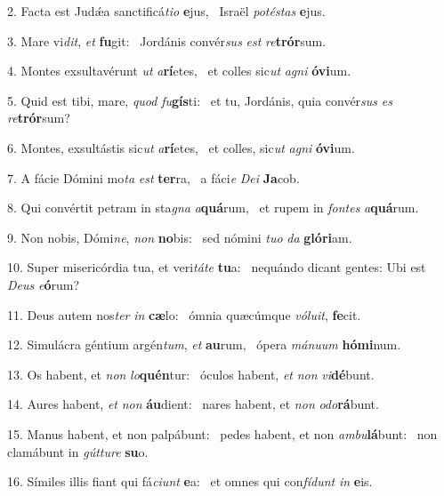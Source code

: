 2. Facta est Judǽa sanctificá\textit{ti}\textit{o} \textbf{e}jus, \ast\  Israël \textit{pot}\textit{és}\textit{tas} \textbf{e}jus.\

3. Mare vi\textit{dit}, \textit{et} \textbf{fu}git: \ast\  Jordánis convér\textit{sus} \textit{est} \textit{re}\textbf{trór}sum.\

4. Montes exsultavérunt \textit{ut} \textit{a}\textbf{rí}etes, \ast\  et colles sic\textit{ut} \textit{a}\textit{gni} \textbf{ó}\textbf{vi}um.\

5. Quid est tibi, mare, \textit{quod} \textit{fu}\textbf{gís}ti: \ast\  et tu, Jordánis, quia convér\textit{sus} \textit{es} \textit{re}\textbf{trór}sum?\

6. Montes, exsultástis sic\textit{ut} \textit{a}\textbf{rí}etes, \ast\  et colles, sic\textit{ut} \textit{a}\textit{gni} \textbf{ó}\textbf{vi}um.\

7. A fácie Dómini mo\textit{ta} \textit{est} \textbf{ter}ra, \ast\  a fáci\textit{e} \textit{De}\textit{i} \textbf{Ja}cob.\

8. Qui convértit petram in sta\textit{gna} \textit{a}\textbf{quá}rum, \ast\  et rupem in \textit{fon}\textit{tes} \textit{a}\textbf{quá}rum.\

9. Non nobis, Dómi\textit{ne}, \textit{non} \textbf{no}bis: \ast\  sed nómini \textit{tu}\textit{o} \textit{da} \textbf{gló}\textbf{ri}am.\

10. Super misericórdia tua, et veri\textit{tá}\textit{te} \textbf{tu}a: \ast\  nequándo dicant gentes: Ubi est \textit{De}\textit{us} \textit{e}\textbf{ó}rum?\

11. Deus autem nos\textit{ter} \textit{in} \textbf{cæ}lo: \ast\  ómnia quæcúmque \textit{vó}\textit{lu}\textit{it}, \textbf{fe}cit.\

12. Simulácra géntium argén\textit{tum}, \textit{et} \textbf{au}rum, \ast\  ópera \textit{má}\textit{nu}\textit{um} \textbf{hó}\textbf{mi}num.\

13. Os habent, et \textit{non} \textit{lo}\textbf{quén}tur: \ast\  óculos habent, \textit{et} \textit{non} \textit{vi}\textbf{dé}bunt.\

14. Aures habent, \textit{et} \textit{non} \textbf{áu}dient: \ast\  nares habent, et \textit{non} \textit{o}\textit{do}\textbf{rá}bunt.\

15. Manus habent, et non palpábunt: \dag\  pedes habent, et non \textit{am}\textit{bu}\textbf{lá}bunt: \ast\  non clamábunt in \textit{gút}\textit{tu}\textit{re} \textbf{su}o.\

16. Símiles illis fiant qui fá\textit{ci}\textit{unt} \textbf{e}a: \ast\  et omnes qui con\textit{fí}\textit{dunt} \textit{in} \textbf{e}is.\

